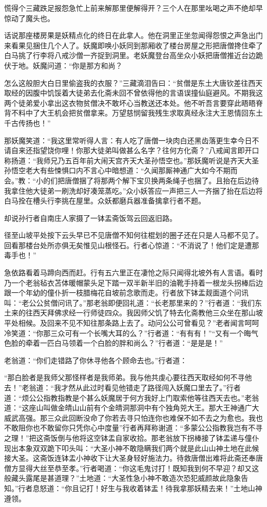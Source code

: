 \documentclass[12pt,UTF8]{ctexbook}
\begin{document}
慌得个三藏跌足报怨急忙上前来解那里便解得开？三个人在那里吆喝之声不绝却早惊动了魔头也。

话说那座楼房果是妖精点化的终日在此拿人。他在洞里正坐忽闻得怨恨之声急出门来看果见捆住几个人了。妖魔即唤小妖同到那厢收了楼台房屋之形把唐僧搀住牵了白马挑了行李将八戒沙僧一齐捉到洞里。老妖魔登台高坐众小妖把唐僧推近台边跪伏于地。妖魔问道：“你是那方和尚？

怎么这般胆大白日里偷盗我的衣服？”三藏滴泪告曰：“贫僧是东土大唐钦差往西天取经的因腹中饥馁着大徒弟去化斋未回不曾依得他的言语误撞仙庭避风。不期我这两个徒弟爱小拿出这衣物贫僧决不敢坏心当教送还本处。他不听吾言要穿此晤晤脊背不料中了大王机会把贫僧拿来。万望慈悯留我残生求取真经永注大王恩情回东土千古传扬也！”

那妖魔笑道：“我这里常听得人言：有人吃了唐僧一块肉白还黑齿落更生幸今日不请自来还指望饶你哩！你那大徒弟叫做甚么名字？往何方化斋？”八戒闻言即开口称扬道：“我师兄乃五百年前大闹天宫齐天大圣孙悟空也。”那妖魔听说是齐天大圣孙悟空老大有些悚惧口内不言心中暗想道：“久闻那厮神通广大如今不期而会。”教：“小的们把唐僧捆了将那两个解下宝贝换两条绳子也捆了。且抬在后边待我拿住他大徒弟一刷洗却好凑笼蒸吃。”众小妖答应一声把三人一齐捆了抬在后边将白马拴在槽头行李挑在屋里。众妖都磨兵器准备擒拿行者不题。

却说孙行者自南庄人家摄了一钵盂斋饭驾云回返旧路。

径至山坡平处按下云头早已不见唐僧不知何往棍划的圈子还在只是人马都不见了。回看那楼台处所亦俱无矣惟见山根怪石。行者心惊道：“不消说了！他们定是遭那毒手也！”

急依路看着马蹄向西而赶。行有五六里正在凄怆之际只闻得北坡外有人言语。看时乃一个老翁毡衣苫体暖帽蒙头足下踏一双半新半旧的油靴手持着一根龙头拐棒后边跟一个年幼的僮仆折一枝腊梅花自坡前念歌而走。行者放下钵盂觌面道个问讯叫：“老公公贫僧问讯了。”那老翁即便回礼道：“长老那里来的？”行者道：“我们东土来的往西天拜佛求经一行师徒四众。我因师父饥了特去化斋教他三众坐在那山坡平处相候。及回来不见不知往那条路上去了。动问公公可曾看见？”老者闻言呵呵冷笑道：“你那三众可有一个长嘴大耳的么？”行者道：“有有有！”“又有一个晦气色脸的牵着一匹白马领着一个白脸的胖和尚么？”行者道：“是是是！”

老翁道：“你们走错路了你休寻他各个顾命去也。”行者道：

“那白脸者是我师父那怪样者是我师弟。我与他共虔心要往西天取经如何不寻他去！”老翁道：“我才然从此过时看见他错走了路径闯入妖魔口里去了。”行者道：“烦公公指教指教是个甚么妖魔居于何方我好上门取索他等往西天去也。”老翁道：“这座山叫做金皘山山前有个金皘洞那洞中有个独角兕大王。那大王神通广大威武高强。那三众此回断没命了你若去寻只怕连你也难保不如不去之为愈也。我也不敢阻你也不敢留你只凭你心中度量”行者再拜称谢道：“多蒙公公指教我岂有不寻之理！”把这斋饭倒与他将这空钵盂自家收拾。那老翁放下拐棒接了钵盂递与僮仆现出本象双双跪下叩头叫：“大圣小神不敢隐瞒我们两个就是此山山神土地在此候接大圣。这斋饭连钵盂小神收下让大圣身轻好施法力。待救唐僧出难将此斋还奉唐僧方显得大丝至恭至孝。”行者喝道：“你这毛鬼讨打！既知我到何不早迎？却又这般藏头露尾是甚道理？”土地道：“大圣性急小神不敢造次恐犯威颜故此隐象告知。”行者息怒道：“你且记打！好生与我收着钵盂！待我拿那妖精去来！”土地山神遵领。
\end{document}
